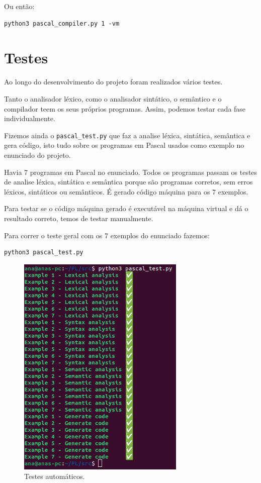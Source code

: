 \documentclass[12pt,a4paper]{report}
\begin{document}
Ou então:

\begin{verbatim}
python3 pascal_compiler.py 1 -vm
\end{verbatim}

\chapter{Testes}

Ao longo do desenvolvimento do projeto foram realizados vários testes.

Tanto o analisador léxico, como o analisador sintático, o semântico e o compilador teem os seus próprios programas. Assim, podemos testar cada fase individualmente.

Fizemos ainda o \texttt{pascal\_test.py} que faz a analise léxica, sintática, semântica e gera código, isto tudo sobre os programas em Pascal usados como exemplo no
enunciado do projeto.

Havia 7 programas em Pascal no enunciado. Todos os programas passam os testes de analise léxica, sintática e semântica porque são programas corretos, sem erros léxicos, sintáticos ou semânticos.
É gerado código máquina  para os 7 exemplos.

Para testar se o código máquina gerado é executável na máquina virtual e dá o resultado correto, temos de testar manualmente.

\vspace{1em}
Para correr o teste geral com os 7 exemplos do enunciado fazemos:
\begin{verbatim}
python3 pascal_test.py
\end{verbatim}

\begin{figure}[H]
    \centering
    \includegraphics[width=8cm]{images/tests.png}
    \caption{Testes automáticos.}    
\end{figure}
\end{document}
